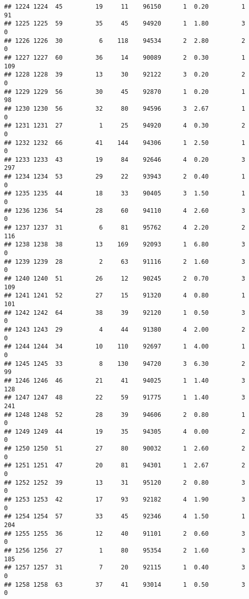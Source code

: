 \documentclass[
]{article}
\begin{document}
\begin{verbatim}
## 1224 1224  45         19     11    96150      1  0.20         1       91
## 1225 1225  59         35     45    94920      1  1.80         3        0
## 1226 1226  30          6    118    94534      2  2.80         2        0
## 1227 1227  60         36     14    90089      2  0.30         1      109
## 1228 1228  39         13     30    92122      3  0.20         2        0
## 1229 1229  56         30     45    92870      1  0.20         1       98
## 1230 1230  56         32     80    94596      3  2.67         1        0
## 1231 1231  27          1     25    94920      4  0.30         2        0
## 1232 1232  66         41    144    94306      1  2.50         1        0
## 1233 1233  43         19     84    92646      4  0.20         3      297
## 1234 1234  53         29     22    93943      2  0.40         1        0
## 1235 1235  44         18     33    90405      3  1.50         1        0
## 1236 1236  54         28     60    94110      4  2.60         3        0
## 1237 1237  31          6     81    95762      4  2.20         2      116
## 1238 1238  38         13    169    92093      1  6.80         3        0
## 1239 1239  28          2     63    91116      2  1.60         3        0
## 1240 1240  51         26     12    90245      2  0.70         3      109
## 1241 1241  52         27     15    91320      4  0.80         1      101
## 1242 1242  64         38     39    92120      1  0.50         3        0
## 1243 1243  29          4     44    91380      4  2.00         2        0
## 1244 1244  34         10    110    92697      1  4.00         1        0
## 1245 1245  33          8    130    94720      3  6.30         2       99
## 1246 1246  46         21     41    94025      1  1.40         3      128
## 1247 1247  48         22     59    91775      1  1.40         3      241
## 1248 1248  52         28     39    94606      2  0.80         1        0
## 1249 1249  44         19     35    94305      4  0.00         2        0
## 1250 1250  51         27     80    90032      1  2.60         2        0
## 1251 1251  47         20     81    94301      1  2.67         2        0
## 1252 1252  39         13     31    95120      2  0.80         3        0
## 1253 1253  42         17     93    92182      4  1.90         3        0
## 1254 1254  57         33     45    92346      4  1.50         1      204
## 1255 1255  36         12     40    91101      2  0.60         3        0
## 1256 1256  27          1     80    95354      2  1.60         3      185
## 1257 1257  31          7     20    92115      1  0.40         3        0
## 1258 1258  63         37     41    93014      1  0.50         3        0

\end{verbatim}
\end{document}
